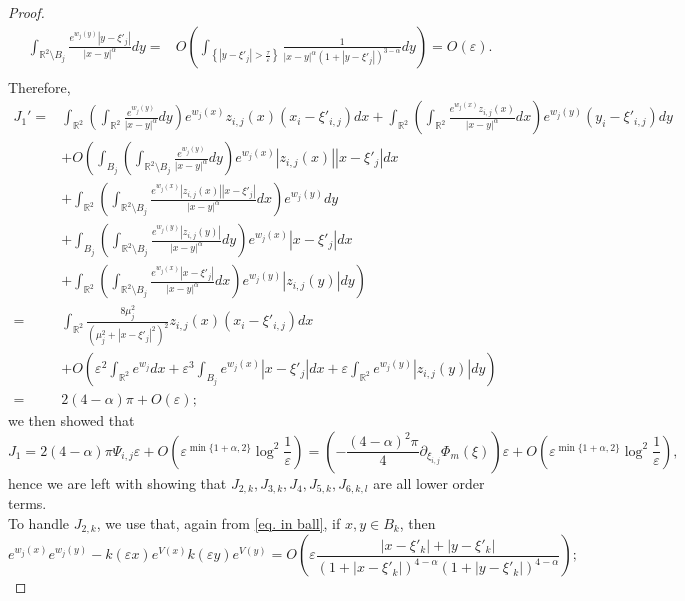 \documentclass[10pt,a4paper]{amsart}
\begin{document}
\begin{proof}
\begin{align*}
\int_{\mathbb R^2\setminus B_j}\frac{e^{w_j(y)}\left|y-\xi'_j\right|}{|x-y|^\alpha}dy=&O\left(\int_{\left\{\left|y-\xi'_j\right|>\frac\tau\varepsilon\right\}}\frac1{|x-y|^\alpha\left(1+\left|y-\xi'_j\right|\right)^{3-\alpha}}dy\right)=O(\varepsilon).\\
\end{align*}
Therefore,
\begin{align*}
J_1'=&\int_{\mathbb R^2}\left(\int_{\mathbb R^2}\frac{e^{w_j(y)}}{|x-y|^\alpha}dy\right)e^{w_j(x)}z_{i,j}(x)\left(x_i-\xi'_{i,j}\right)dx+\int_{\mathbb R^2}\left(\int_{\mathbb R^2}\frac{e^{w_j(x)}z_{i,j}(x)}{|x-y|^\alpha}dx\right)e^{w_j(y)}\left(y_i-\xi'_{i,j}\right)dy\\
&+O\left(\int_{B_j}\left(\int_{\mathbb R^2\setminus B_j}\frac{e^{w_j(y)}}{|x-y|^\alpha}dy\right)e^{w_j(x)}|z_{i,j}(x)|\left|x-\xi'_j\right|dx\right.\\
&\left.+\int_{\mathbb R^2}\left(\int_{\mathbb R^2\setminus B_j}\frac{e^{w_j(x)}|z_{i,j}(x)|\left|x-\xi'_j\right|}{|x-y|^\alpha}dx\right)e^{w_j(y)}dy\right.\\
&\left.+\int_{B_j}\left(\int_{\mathbb R^2\setminus B_j}\frac{e^{w_j(y)}|z_{i,j}(y)|}{|x-y|^\alpha}dy\right)e^{w_j(x)}\left|x-\xi'_j\right|dx\right.\\
&\left.+\int_{\mathbb R^2}\left(\int_{\mathbb R^2\setminus B_j}\frac{e^{w_j(x)}\left|x-\xi'_j\right|}{|x-y|^\alpha}dx\right)e^{w_j(y)}|z_{i,j}(y)|dy\right)\\
=&\int_{\mathbb R^2}\frac{8\mu_j^2}{\left(\mu_j^2+\left|x-\xi'_j\right|^2\right)^2}z_{i,j}(x)\left(x_i-\xi'_{i,j}\right)dx\\
&+O\left(\varepsilon^2\int_{\mathbb R^2}e^{w_j}dx+\varepsilon^3\int_{B_j}e^{w_j(x)}\left|x-\xi'_j\right|dx+\varepsilon\int_{\mathbb R^2}e^{w_j(y)}|z_{i,j}(y)|dy\right)\\
=&2(4-\alpha)\pi+O(\varepsilon);
\end{align*}
we then showed that
$$J_1=2(4-\alpha)\pi\Psi_{i,j}\varepsilon+O\left(\varepsilon^{\min\{1+\alpha,2\}}\log^2\frac1\varepsilon\right)=\left(-\frac{(4-\alpha)^2\pi}4\partial_{\xi_{i,j}}\Phi_m(\xi)\right)\varepsilon+O\left(\varepsilon^{\min\{1+\alpha,2\}}\log^2\frac1\varepsilon\right),$$
hence we are left with showing that $J_{2,k},J_{3,k},J_4,J_{5,k},J_{6,k,l}$ are all lower order terms.\\
To handle $J_{2,k}$, we use that, again from \eqref{eq. in ball}, if $x,y\in B_k$, then
$$e^{w_j(x)}e^{w_j(y)}-k(\varepsilon x)e^{V(x)}k(\varepsilon y)e^{V(y)}=O\left(\varepsilon\frac{\left|x-\xi'_k\right|+\left|y-\xi'_k\right|}{\left(1+\left|x-\xi'_k\right|\right)^{4-\alpha}\left(1+\left|y-\xi'_k\right|\right)^{4-\alpha}}\right);$$

\end{proof}
\end{document}
